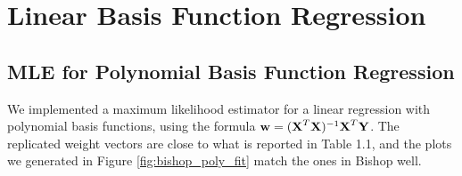 
\section{Linear Basis Function Regression}\label{sec:lin_basis_fn_reg}

\subsection{MLE for Polynomial Basis Function Regression}
We implemented a maximum likelihood estimator for a linear regression with polynomial basis functions, using the formula $\boldsymbol{\mathbf{w}} = (\boldsymbol{\mathbf{X}}^T\boldsymbol{\mathbf{X}})^{-1} \boldsymbol{\mathbf{X}}^T\boldsymbol{\mathbf{Y}}$. The replicated weight vectors are close to what is reported in Table 1.1, and the plots we generated in Figure \ref{fig:bishop_poly_fit} match the ones in Bishop well.

